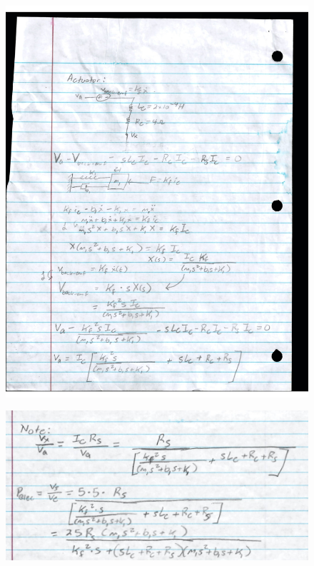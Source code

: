 \documentclass[a4paper, titlepage, 12pt]{article}
\begin{document}
\begin{enumerate}
\begin{figure}[H]
			\end{figure}
			\begin{figure}[H]
				\centering
				\includegraphics[width=\linewidth]{images/p_elec_emf_2.jpg}
			\end{figure}
			\begin{figure}[H]
				\centering
				\includegraphics[width=\linewidth]{images/p_elec_emf_3.jpg}
			\end{figure}

\end{enumerate}
\end{document}
